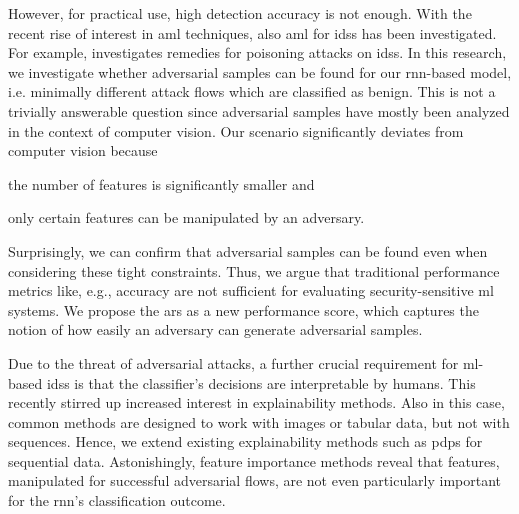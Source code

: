 \documentclass[conference]{IEEEtran}
\begin{document}
However, for practical use, high detection accuracy is not enough. With the recent rise of interest in \gls{aml} techniques, also \gls{aml} for \glspl{ids} has been investigated. For example, \cite{bachl_walling_2019} investigates remedies for poisoning attacks on \glspl{ids}.
In this research, we investigate whether adversarial samples can be found for our \gls{rnn}-based model, i.e. minimally different attack flows which are classified as benign. This is not a trivially answerable question since adversarial samples have mostly been analyzed in the context of computer vision. Our scenario significantly deviates from computer vision because \begin{enumerate*}
\item the number of features is significantly smaller and
\item only certain features can be manipulated by an adversary. %
\end{enumerate*}

Surprisingly, we can confirm that adversarial samples can be found even when considering these tight constraints. %
Thus, we argue that traditional performance metrics like, e.g., accuracy are not sufficient for evaluating security-sensitive \gls{ml} systems.
We propose the \acrfull{ars} as a new performance score, which captures the notion of how easily an adversary can generate adversarial samples.

Due to the threat of adversarial attacks, a further crucial requirement for \gls{ml}-based \glspl{ids} is that the classifier's decisions are interpretable by humans. This recently stirred up increased interest in explainability methods. Also in this case, common methods are designed to work with images or tabular data, but not with sequences. Hence, we extend existing explainability methods such as \glspl{pdp} \cite{friedman_greedy_2001} for sequential data. %
Astonishingly, feature importance methods reveal that
features, manipulated for successful adversarial flows,
are not even particularly important for the \gls{rnn}'s classification outcome. %

\end{document}
